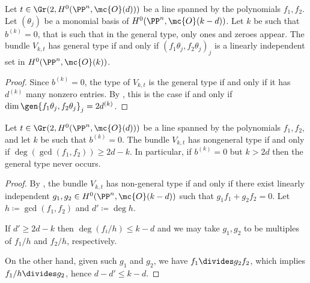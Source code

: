 \begin{corollary} \label{no-more-than-ones}
	Let $t\in \Gr(2,H^0(\PP^n, \mc{O}(d)))$ be a line spanned by the polynomials $f_1,f_2$. Let $(\theta_j)$ be a monomial basis of $H^0(\PP^n, \mc{O}(k-d))$. Let $k$ be such that $b^{(k)}=0$, that is such that in the general type, only ones and zeroes appear. The bundle $V_{k,t}$ has general type if and only if
	$(f_1\theta_j,f_2\theta_j)_j$ is a linearly independent set in $H^0(\PP^n,\mc{O}(k))$.
\end{corollary}

\begin{proof}
  Since $b^{(k)}=0$, the type of $V_{k,t}$ is the general type if and only if it has $d^{(k)}$ many nonzero entries.
	By , this is the case if and only if $\dim\gen{f_1 \theta_j, f_2 \theta_j}_j = 2 d^{(k)}$.
\end{proof}

\begin{proposition} \label{nongeneral-type-shared-sections}
	Let $t\in \Gr(2,H^0(\PP^n, \mc{O}(d)))$ be a line spanned by the polynomials $f_1,f_2$, and let $k$ be such that $b^{(k)}=0$. The bundle $V_{k,t}$ has nongeneral type if and only if $\deg(\gcd(f_1,f_2)) \geq 2d-k$. In particular, if $b^{(k)}=0$ but $k>2d$ then the general type never occurs.
\end{proposition}

\begin{proof}
	By , the bundle $V_{k,t}$ has non-general type if and only if there exist linearly independent $g_1,g_2\in H^0(\PP^n,\mc{O}(k-d))$ such that $g_1f_1+g_2f_2 = 0$. Let $h \coloneqq \gcd(f_1,f_2)$ and $d'\coloneqq \deg h$.

	If $d' \geq 2d-k$ then $\deg (f_i/h) \leq k-d$ and we may take $g_1,g_2$ to be multiples of $f_1/h$ and $f_2/h$, respectively.

	On the other hand, given such $g_1$ and $g_2$, we have $f_1\divides g_2 f_2$, which implies $f_1/h \divides g_2$, hence $d-d'\leq k-d$.
\end{proof}

